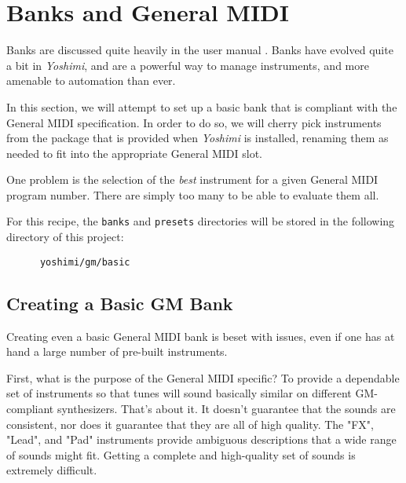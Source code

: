 %
%
%

\section{Banks and General MIDI}
\label{sec:cookbook_banks}

   Banks are discussed quite heavily in the user manual \cite{yoshimidoc}.
   Banks have evolved quite a bit in \textsl{Yoshimi}, and are
   a powerful way to manage instruments, and more amenable to automation
   than ever.

   In this section, we will attempt to set up a basic bank that is
   compliant with the General MIDI specification.  In order to do so, we
   will cherry pick instruments from the package that is provided when
   \textsl{Yoshimi} is installed, renaming them as needed to fit into the
   appropriate General MIDI slot.

   One problem is the selection of the \textsl{best} instrument for a given
   General MIDI program number.  There are simply too many to be able to
   evaluate them all.

   For this recipe, the \texttt{banks} and \texttt{presets} directories will
   be stored in the following directory of this project:

   \begin{verbatim}
      yoshimi/gm/basic
   \end{verbatim}

\subsection{Creating a Basic GM Bank}
\label{subsec:cookbook_banks_basic_gm}

   Creating even a basic General MIDI bank is beset with issues, even if one
   has at hand a large number of pre-built instruments.

   First, what is the purpose of the General MIDI specific?  To provide a
   dependable set of instruments so that tunes will sound basically similar
   on different GM-compliant synthesizers.  That's about it.  It doesn't
   guarantee that the sounds are consistent, nor does it guarantee that they
   are all of high quality.  The "FX", "Lead", and "Pad" instruments provide
   ambiguous descriptions that a wide range of sounds might fit.
   Getting a complete and high-quality set of sounds is extremely difficult.


